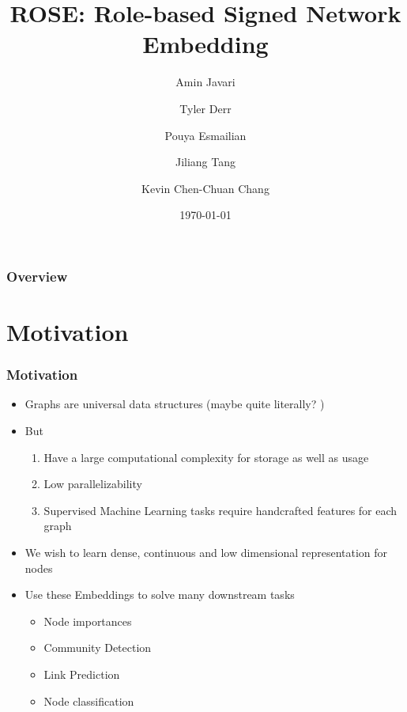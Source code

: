 \documentclass{beamer}
\title[Singed Network Embeddings]{ROSE: Role-based Signed Network Embedding
}
\author[Javari et al.]{Amin Javari \and Tyler Derr \and Pouya Esmailian \and Jiliang Tang \and Kevin Chen-Chuan Chang}
\date{\today}
\begin{document}
\begin{frame}
    \titlepage
\end{frame}

\begin{frame}
    \frametitle{Overview}
    \tableofcontents
\end{frame}


\section{Motivation}
\begin{frame}
    \frametitle{Motivation}

    \begin{itemize}
        
        \item Graphs are universal data structures (maybe quite literally? \cite{wolfram2020class})
        \item But
        \begin{enumerate}
            \item Have a large computational complexity for storage as well as usage
            \item Low parallelizability
            \item Supervised Machine Learning tasks require handcrafted features for each graph
        \end{enumerate}
        \item We wish to learn dense, continuous and low dimensional representation  for nodes \cite{Cui_2019Survey}
        \item Use these Embeddings to solve many downstream tasks
        \begin{itemize}
            \item Node importances
            \item Community Detection
            \item Link Prediction
            \item Node classification
        \end{itemize}
    \end{itemize}

\end{frame}
\end{document}
